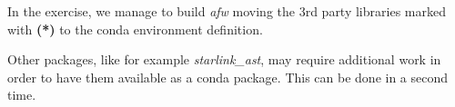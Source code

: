 In the  exercise, we manage to build \textit{afw} moving the 3rd party libraries marked with \textbf{(*)} to the conda environment definition.

Other packages, like for example \textit{starlink\_ast}, may require additional work in order to have them available as a conda package.
This can be done in a second time.


